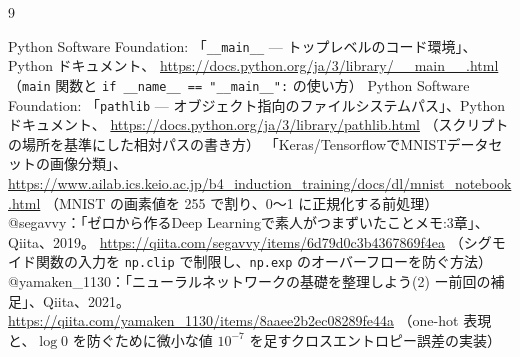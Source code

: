 \documentclass[a4paper,11pt]{ltjsarticle}
\begin{document}
\begingroup
\renewcommand{\section}[2]{}
\raggedright %
\begin{thebibliography}{9}
  
    Python Software Foundation: 「\texttt{\_\_main\_\_} --- トップレベルのコード環境」、Python ドキュメント、
    \url{https://docs.python.org/ja/3/library/__main__.html}
    \newline（\texttt{main} 関数と \texttt{if \_\_name\_\_ == "\_\_main\_\_":} の使い方）
    Python Software Foundation: 「\texttt{pathlib} --- オブジェクト指向のファイルシステムパス」、Python ドキュメント、
    \url{https://docs.python.org/ja/3/library/pathlib.html}
    \newline（スクリプトの場所を基準にした相対パスの書き方）
    「Keras/TensorflowでMNISTデータセットの画像分類」、
    \newline\url{https://www.ailab.ics.keio.ac.jp/b4_induction_training/docs/dl/mnist_notebook.html}
    \newline（MNIST の画素値を 255 で割り、0～1 に正規化する前処理）
    @segavvy：「ゼロから作るDeep Learningで素人がつまずいたことメモ:3章」、Qiita、2019。
    \url{https://qiita.com/segavvy/items/6d79d0c3b4367869f4ea}
    \newline（シグモイド関数の入力を \texttt{np.clip} で制限し、\texttt{np.exp} のオーバーフローを防ぐ方法）
    @yamaken\_1130：「ニューラルネットワークの基礎を整理しよう(2) ー前回の補足」、Qiita、2021。
    \url{https://qiita.com/yamaken_1130/items/8aaee2b2ec08289fe44a}
    \newline（one-hot 表現と、$\log 0$ を防ぐために微小な値 $10^{-7}$ を足すクロスエントロピー誤差の実装）
\end{thebibliography}
\endgroup
\end{document}
